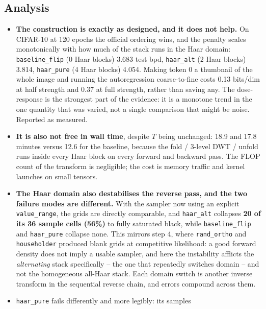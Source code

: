 \documentclass[11pt]{article}
\begin{document}
\subsection{Analysis}
\label{sec:step6analysis}
\begin{itemize}
  \item \textbf{The construction is exactly as designed, and it does not
        help.} On CIFAR-10 at 120 epochs the official ordering wins, and the
        penalty scales monotonically with how much of the stack runs in the
        Haar domain: \texttt{baseline\_flip} (0 Haar blocks) 3.683 test bpd,
        \texttt{haar\_alt} (2 Haar blocks) 3.814, \texttt{haar\_pure}
        (4 Haar blocks) 4.054. Making token 0 a thumbnail of the whole image
        and running the autoregression coarse-to-fine costs 0.13 bits/dim at
        half strength and 0.37 at full strength, rather than saving any. The
        dose-response is the strongest part of the evidence: it is a
        monotone trend in the one quantity that was varied, not a single
        comparison that might be noise. Reported as measured.
  \item \textbf{It is also not free in wall time}, despite $T$ being
        unchanged: 18.9 and 17.8 minutes versus 12.6 for the baseline,
        because the fold / 3-level DWT / unfold runs inside every Haar block
        on every forward and backward pass. The FLOP count of the transform is
        negligible; the cost is memory traffic and kernel launches on small
        tensors.
  \item \textbf{The Haar domain also destabilises the reverse pass, and the
        two failure modes are different.} With the sampler now using an
        explicit \texttt{value\_range}, the grids are directly comparable, and
        \texttt{haar\_alt} collapses \textbf{20 of its 36 sample cells (56\%)}
        to fully saturated black, while \texttt{baseline\_flip} and
        \texttt{haar\_pure} collapse none. This mirrors step 4, where
        \texttt{rand\_ortho} and \texttt{householder} produced blank grids at
        competitive likelihood: a good forward density does not imply a usable
        sampler, and here the instability afflicts the \emph{alternating}
        stack specifically -- the one that repeatedly switches domain -- and
        not the homogeneous all-Haar stack. Each domain switch is another
        inverse transform in the sequential reverse chain, and errors compound
        across them.
  \item \texttt{haar\_pure} fails differently and more legibly: its samples

\end{itemize}
\end{document}
